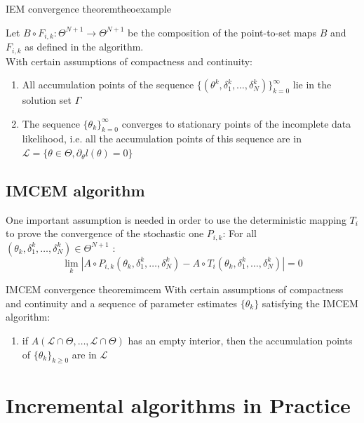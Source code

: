 \documentclass[a0,portrait]{a0poster}
\begin{document}
\begin{multicols}{2}
\begin{mytheo}{IEM convergence theorem}{theoexample}

Let $B \circ F_{i,k}: \Theta^{N+1} \to \Theta^{N+1}$ be the composition of the point-to-set maps $B$ and $F_{i,k}$ as defined in the algorithm.\\
With certain assumptions of compactness and continuity:
\begin{enumerate}
\item All accumulation points of the sequence $\{(\theta^k, \delta_1^k,\dots, \delta_N^k)\}_{k=0}^{\infty}$ lie in the solution set $\Gamma$
\item The sequence $\{\theta_k\}_{k=0}^{\infty}$ converges to stationary points of the incomplete data likelihood, i.e. all the accumulation points of this sequence are in  $\mathcal{L} = \{\theta \in \Theta, \partial_{\theta}l(\theta) = 0 \}$
\end{enumerate}

\end{mytheo}



\subsection{IMCEM algorithm}
One important assumption is needed in order to use the deterministic mapping $T_{i}$ to prove the convergence of the stochastic one $P_{i,k}$:
For all $(\theta_k, \delta_1^k,\dots,\delta_N^k) \in \Theta^{N+1}$ :
\begin{equation*}
\lim\limits_{k} |A \circ P_{i,k}(\theta_k, \delta_1^k,\dots,\delta_N^k) - A \circ T_i(\theta_k, \delta_1^k,\dots,\delta_N^k)| = 0
\end{equation*}

 \begin{mytheo}{IMCEM convergence theorem}{imcem}
With certain assumptions of compactness and continuity and a sequence of parameter estimates $\{\theta_{k}\}$ satisfying the IMCEM algorithm:
\begin{enumerate}
  \item if $A(\mathcal{L}\cap\Theta,\dots,\mathcal{L}\cap\Theta)$ has an empty interior, then the accumulation points of $\{\theta_{k}\}_{k \geq 0}$ are in $\mathcal{L}$
\end{enumerate}
\end{mytheo}
   
   
   
\section{Incremental algorithms in Practice}


\end{multicols}
\end{document}
